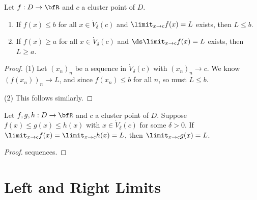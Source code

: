     \begin{theorem}
        Let $f:D \rightarrow \bfR$ and $c$ a cluster point of $D$.
        \begin{enumerate}[label = (\arabic*)]
            \item If $f(x) \leq b$ for all $x \in \dot{V}_\delta(c)$ and $\displaystyle \limit_{x\rightarrow c} f(x) = L$ exists, then $L \leq b$.
            \item If $f(x) \geq a$ for all $x \in \dot{V}_\delta(c)$ and $\ds \limit_{x \rightarrow c}f(x) = L$ exists, then $L \geq a$.
        \end{enumerate}
    \end{theorem}
        \begin{proof}
            (1) Let $(x_n)_n$ be a sequence in $\dot{V}_\delta(c)$ with $(x_n)_n \rightarrow c$. We know $(f(x_n))_n \rightarrow L$, and since $f(x_n) \leq b$ for all $n$, so must $L \leq b$. \nl

            (2) This follows similarly.
        \end{proof}

    \begin{theorem}
        Let $f,g,h:D \rightarrow \bfR$ and $c$ a cluster point of $D$. Suppose $f(x) \leq g(x) \leq h(x)$ with $x \in \dot{V}_\delta(c)$ for some $\delta > 0$. If $\limit_{x \rightarrow c}f(x) = \limit_{x \rightarrow c}h(x) = L$, then $\limit_{x \rightarrow c}g(x) = L$.
    \end{theorem}
        \begin{proof}
            {\color{red} sequences}.
        \end{proof}

\section{Left and Right Limits}

